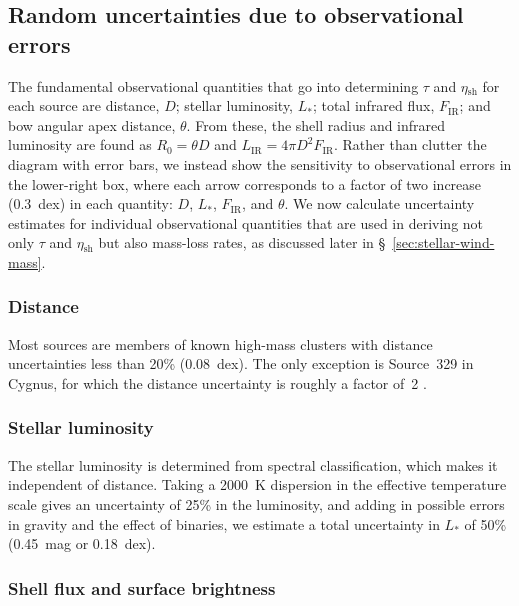 \documentclass[useAMS, usenatbib, a4paper]{mnras}
\newcommand\shell{\ensuremath{_{\text{sh}}}}
\begin{document}
\subsection{Random uncertainties due to observational errors}
\label{sec:rand-syst-uncert}

The fundamental observational quantities that go into determining
\(\tau\) and \(\eta\shell\) for each source are distance, \(D\); stellar
luminosity, \(L_*\); total infrared flux, \(F_{\text{IR}}\); and bow
angular apex distance, \(\theta\).  From these, the shell radius and
infrared luminosity are found as \(R_0 = \theta D\) and
\(L_{\text{IR}} = 4\pi D^2 F_{\text{IR}}\).  Rather than clutter the
diagram with error bars, we instead show the sensitivity to
observational errors in the lower-right box, where each arrow
corresponds to a factor of two increase (0.3~dex) in each quantity:
\(D\), \(L_*\), \(F_{\text{IR}}\), and \(\theta\).  We now calculate
uncertainty estimates for individual observational quantities that are
used in deriving not only \(\tau\) and \(\eta\shell\) but also mass-loss
rates, as discussed later in \S~\ref{sec:stellar-wind-mass}.

\subsubsection{Distance}
\label{sec:distance}

Most sources are members of known high-mass clusters with distance
uncertainties less than 20\% (0.08~dex). The only exception is
Source~329 in Cygnus, for which the distance uncertainty is roughly a
factor of~2 \citep{Kobulnicky:2018a}.

\subsubsection{Stellar luminosity}
\label{sec:stellar-luminosity}

The stellar luminosity is determined from spectral classification,
which makes it independent of distance.  Taking a \SI{2000}{K}
dispersion in the effective temperature scale \citep{Martins:2005a}
gives an uncertainty of 25\% in the luminosity, and adding in possible
errors in gravity and the effect of binaries, we estimate a total
uncertainty in \(L_*\) of 50\% (0.45~mag or 0.18~dex).

\subsubsection{Shell flux and surface brightness}
\label{sec:shell-flux-surface}
\end{document}
